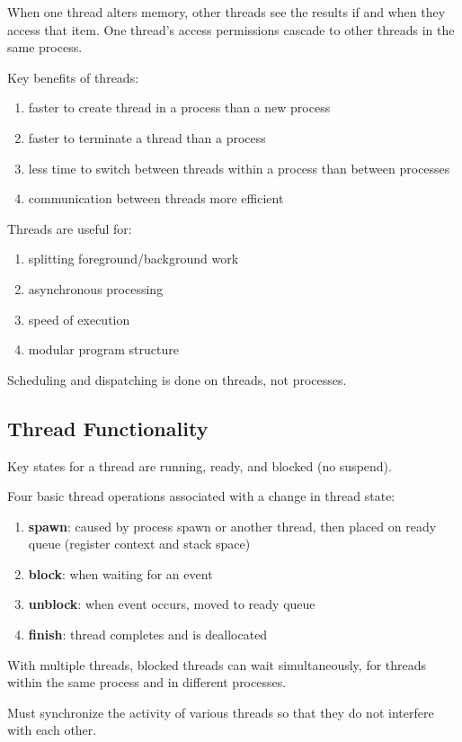 \documentclass[11pt]{article}
\begin{document}
When one thread alters memory, other threads see the
results if and when they access that item.
One thread's access permissions cascade to other threads
in the same process.

Key benefits of threads:
\begin{enumerate}
\item faster to create thread in a process than a new process
\item faster to terminate a thread than a process
\item less time to switch between threads within a process
than between processes
\item communication between threads more efficient
\end{enumerate}

Threads are useful for:
\begin{enumerate}
\item splitting foreground/background work
\item asynchronous processing
\item speed of execution
\item modular program structure
\end{enumerate}

Scheduling and dispatching is done on threads, not processes.
\subsection{Thread Functionality}
\label{sec:org5044cc7}

Key states for a thread are running, ready, and blocked (no suspend).

Four basic thread operations associated with a change
in thread state:
\begin{enumerate}
\item \textbf{spawn}: caused by process spawn or another thread,
then placed on ready queue (register context and stack space)
\item \textbf{block}: when waiting for an event
\item \textbf{unblock}: when event occurs, moved to ready queue
\item \textbf{finish}: thread completes and is deallocated
\end{enumerate}

With multiple threads, blocked threads can wait simultaneously,
for threads within the same process and in different processes.

Must synchronize the activity of various threads so that
they do not interfere with each other.
\end{document}
